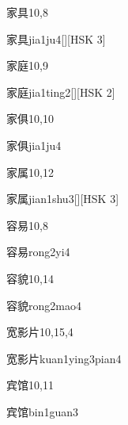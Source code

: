 \begin{entry}{家具}{10,8}
  \begin{phonetics}{家具}{jia1ju4}[][HSK 3]
  \end{phonetics}
\end{entry}

\begin{entry}{家庭}{10,9}
  \begin{phonetics}{家庭}{jia1ting2}[][HSK 2]
  \end{phonetics}
\end{entry}

\begin{entry}{家俱}{10,10}
  \begin{phonetics}{家俱}{jia1ju4}
  \end{phonetics}
\end{entry}

\begin{entry}{家属}{10,12}
  \begin{phonetics}{家属}{jian1shu3}[][HSK 3]
  \end{phonetics}
\end{entry}

\begin{entry}{容易}{10,8}
  \begin{phonetics}{容易}{rong2yi4}
  \end{phonetics}
\end{entry}

\begin{entry}{容貌}{10,14}
  \begin{phonetics}{容貌}{rong2mao4}
  \end{phonetics}
\end{entry}

\begin{entry}{宽影片}{10,15,4}
  \begin{phonetics}{宽影片}{kuan1ying3pian4}
  \end{phonetics}
\end{entry}

\begin{entry}{宾馆}{10,11}
  \begin{phonetics}{宾馆}{bin1guan3}
  \end{phonetics}
\end{entry}

